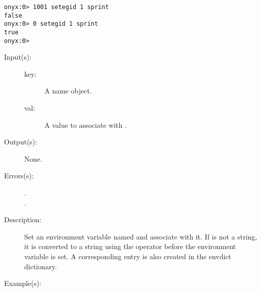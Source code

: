 \begin{description}
\begin{description}
\begin{verbatim}
onyx:0> 1001 setegid 1 sprint
false
onyx:0> 0 setegid 1 sprint
true
onyx:0>
		\end{verbatim}
	\end{description}
\label{systemdict:setenv}
\item[{\onyxop{key val}{setenv}{--}}: ]
	\begin{description}\item[]
	\item[Input(s): ]
		\begin{description}\item[]
		\item[key: ]
			A name object.
		\item[val: ]
			A value to associate with .
		\end{description}
	\item[Output(s): ] None.
	\item[Errors(s): ]
		\begin{description}\item[]
		\item[.]
		\item[.]
		\end{description}
	\item[Description: ]
		Set an environment variable named  and associate
		 with it.  If  is not a string, it is
		converted to a string using the
		 operator before the
		environment variable is set.  A corresponding entry is also
		created in the envdict dictionary.
	\item[Example(s): ]\begin{verbatim}


\end{verbatim}
\end{description}
\end{description}
